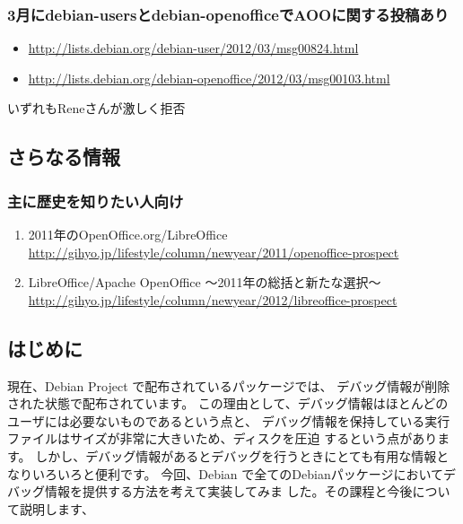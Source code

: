 \documentclass[mingoth,a4paper]{jsarticle}
\begin{document}
\subsubsection{3月にdebian-usersとdebian-openofficeでAOOに関する投稿あり}
\begin{itemize}
\item \url{http://lists.debian.org/debian-user/2012/03/msg00824.html}
\item \url{http://lists.debian.org/debian-openoffice/2012/03/msg00103.html}
\end{itemize}
いずれもReneさんが激しく拒否

\subsection{さらなる情報}
\subsubsection{主に歴史を知りたい人向け}
\begin{enumerate}
\item 2011年のOpenOffice.org/LibreOffice
\\
\url{http://gihyo.jp/lifestyle/column/newyear/2011/openoffice-prospect}
\item LibreOffice/Apache OpenOffice 〜2011年の総括と新たな選択〜
\\
\url{http://gihyo.jp/lifestyle/column/newyear/2012/libreoffice-prospect}
\end{enumerate}

\label{sec:debug.debian.net}

\subsection{はじめに}
現在、Debian Project で配布されているパッケージでは、
デバッグ情報が削除された状態で配布されています。
この理由として、デバッグ情報はほとんどのユーザには必要ないものであるという点と、
デバッグ情報を保持している実行ファイルはサイズが非常に大きいため、ディスクを圧迫
するという点があります。
しかし、デバッグ情報があるとデバッグを行うときにとても有用な情報となりいろいろと便利です。
今回、Debian で全てのDebianパッケージにおいてデバッグ情報を提供する方法を考えて実装してみま
した。その課程と今後について説明します、
\end{document}
